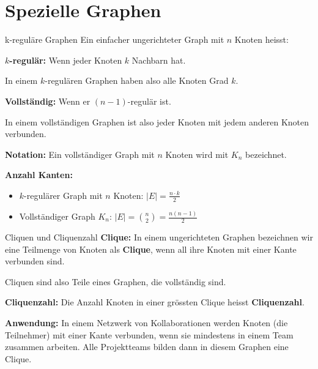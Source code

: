 \documentclass[a4paper, fontsize=7pt]{scrartcl}
\begin{document}
\section{Spezielle Graphen}

\begin{mainbox}{k-regul\"are Graphen}
Ein einfacher ungerichteter Graph mit $n$ Knoten heisst:

\textbf{$k$-regul\"ar:}
Wenn jeder Knoten $k$ Nachbarn hat.

In einem $k$-regul\"aren Graphen haben also alle Knoten Grad $k$.

\textbf{Vollst\"andig:}
Wenn er $(n-1)$-regul\"ar ist.

In einem vollst\"andigen Graphen ist also jeder Knoten mit jedem anderen Knoten verbunden.

\textbf{Notation:} Ein vollst\"andiger Graph mit $n$ Knoten wird mit $K_n$ bezeichnet.

\textbf{Anzahl Kanten:}
\begin{itemize}
    \item $k$-regul\"arer Graph mit $n$ Knoten: $|E| = \frac{n \cdot k}{2}$
    \item Vollst\"andiger Graph $K_n$: $|E| = \binom{n}{2} = \frac{n(n-1)}{2}$
\end{itemize}
\end{mainbox}

\begin{mainbox}{Cliquen und Cliquenzahl}
\textbf{Clique:}
In einem ungerichteten Graphen bezeichnen wir eine Teilmenge von Knoten als \textbf{Clique}, wenn all ihre Knoten mit einer Kante verbunden sind.

Cliquen sind also Teile eines Graphen, die vollst\"andig sind.

\textbf{Cliquenzahl:}
Die Anzahl Knoten in einer gr\"ossten Clique heisst \textbf{Cliquenzahl}.

\textbf{Anwendung:}
In einem Netzwerk von Kollaborationen werden Knoten (die Teilnehmer) mit einer Kante verbunden, wenn sie mindestens in einem Team zusammen arbeiten. Alle Projektteams bilden dann in diesem Graphen eine Clique.
\end{mainbox}
\end{document}
